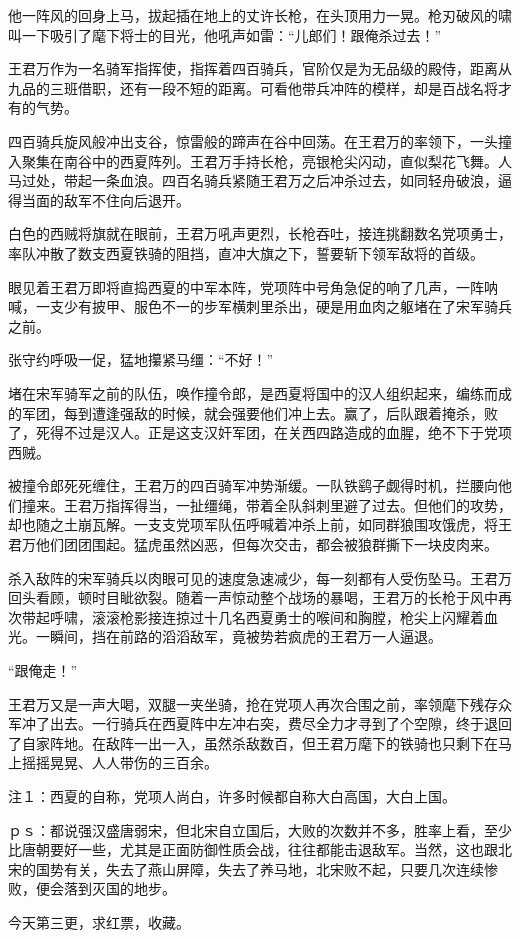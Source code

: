 他一阵风的回身上马，拔起插在地上的丈许长枪，在头顶用力一晃。枪刃破风的啸叫一下吸引了麾下将士的目光，他吼声如雷：“儿郎们！跟俺杀过去！”

王君万作为一名骑军指挥使，指挥着四百骑兵，官阶仅是为无品级的殿侍，距离从九品的三班借职，还有一段不短的距离。可看他带兵冲阵的模样，却是百战名将才有的气势。

四百骑兵旋风般冲出支谷，惊雷般的蹄声在谷中回荡。在王君万的率领下，一头撞入聚集在南谷中的西夏阵列。王君万手持长枪，亮银枪尖闪动，直似梨花飞舞。人马过处，带起一条血浪。四百名骑兵紧随王君万之后冲杀过去，如同轻舟破浪，逼得当面的敌军不住向后退开。

白色的西贼将旗就在眼前，王君万吼声更烈，长枪吞吐，接连挑翻数名党项勇士，率队冲散了数支西夏铁骑的阻挡，直冲大旗之下，誓要斩下领军敌将的首级。

眼见着王君万即将直捣西夏的中军本阵，党项阵中号角急促的响了几声，一阵呐喊，一支少有披甲、服色不一的步军横刺里杀出，硬是用血肉之躯堵在了宋军骑兵之前。

张守约呼吸一促，猛地攥紧马缰：“不好！”

堵在宋军骑军之前的队伍，唤作撞令郎，是西夏将国中的汉人组织起来，编练而成的军团，每到遭逢强敌的时候，就会强要他们冲上去。赢了，后队跟着掩杀，败了，死得不过是汉人。正是这支汉奸军团，在关西四路造成的血腥，绝不下于党项西贼。

被撞令郎死死缠住，王君万的四百骑军冲势渐缓。一队铁鹞子觑得时机，拦腰向他们撞来。王君万指挥得当，一扯缰绳，带着全队斜刺里避了过去。但他们的攻势，却也随之土崩瓦解。一支支党项军队伍呼喊着冲杀上前，如同群狼围攻饿虎，将王君万他们团团围起。猛虎虽然凶恶，但每次交击，都会被狼群撕下一块皮肉来。

杀入敌阵的宋军骑兵以肉眼可见的速度急速减少，每一刻都有人受伤坠马。王君万回头看顾，顿时目眦欲裂。随着一声惊动整个战场的暴喝，王君万的长枪于风中再次带起呼啸，滚滚枪影接连掠过十几名西夏勇士的喉间和胸膛，枪尖上闪耀着血光。一瞬间，挡在前路的滔滔敌军，竟被势若疯虎的王君万一人逼退。

“跟俺走！”

王君万又是一声大喝，双腿一夹坐骑，抢在党项人再次合围之前，率领麾下残存众军冲了出去。一行骑兵在西夏阵中左冲右突，费尽全力才寻到了个空隙，终于退回了自家阵地。在敌阵一出一入，虽然杀敌数百，但王君万麾下的铁骑也只剩下在马上摇摇晃晃、人人带伤的三百余。

注１：西夏的自称，党项人尚白，许多时候都自称大白高国，大白上国。

ｐｓ：都说强汉盛唐弱宋，但北宋自立国后，大败的次数并不多，胜率上看，至少比唐朝要好一些，尤其是正面防御性质会战，往往都能击退敌军。当然，这也跟北宋的国势有关，失去了燕山屏障，失去了养马地，北宋败不起，只要几次连续惨败，便会落到灭国的地步。

今天第三更，求红票，收藏。

